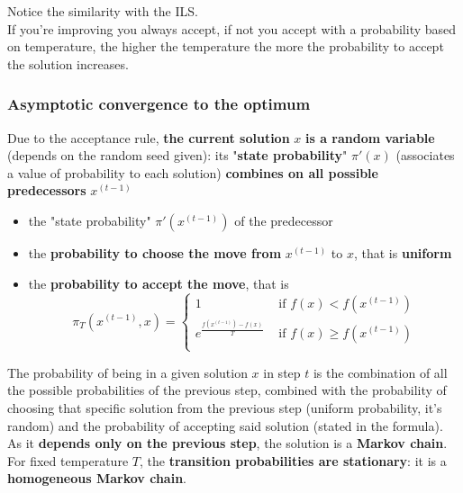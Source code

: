 \documentclass[11pt]{article}
\begin{document}
	Notice the similarity with the ILS.\\
	
	If you're improving you always accept, if not you accept with a probability based on temperature, the higher the temperature the more the probability to accept the solution increases.\\
	
	\newpage
	
	\subsubsection{Asymptotic convergence to the optimum}
	
	Due to the acceptance rule, \textbf{the current solution} $x$ \textbf{is a random variable} (depends on the random seed given): its "\textbf{state probability}" $\pi' (x)$ (associates a value of probability to each solution) \textbf{combines on all possible predecessors} $x^{(t−1)}$ 
	\begin{itemize}
		\item the "state probability" $\pi' (x^{(t−1)})$ of the predecessor
		
		\item the \textbf{probability to choose the move from} $x^{(t−1)}$ to $x$, that is \textbf{uniform}
		
		\item the \textbf{probability to accept the move}, that is
		$$ \pi_T \left(x^{(t-1)}, x\right) = \begin{cases}
			1 & \text{ if } f(x) < f \left(x^{(t-1)}\right) \\
			e^{\frac{f\left(x^{(t-1)}\right) - f(x)}{T}} & \text{ if } f(x) \geq f \left(x^{(t-1)}\right) \\
		\end{cases}$$
	\end{itemize}
	
	The probability of being in a given solution $x$ in step $t$ is the combination of all the possible probabilities of the previous step, combined with the probability of choosing that specific solution from the previous step (uniform probability, it's random) and the probability of accepting said solution (stated in the formula).\\
	
	As it \textbf{depends only on the previous step}, the solution is a \textbf{Markov chain}.\\
	
	For fixed temperature $T$, the \textbf{transition probabilities are stationary}: it is a \textbf{homogeneous Markov chain}.\\
	
\end{document}
